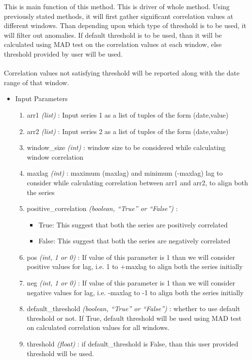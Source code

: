 This is main function of this method. This is driver of whole method. Using 
previously stated methods, it will first gather significant correlation values at different 
windows. Than depending upon which type of threshold is to be used, it will 
filter out anomalies. If default threshold is to be used, than it will be 
calculated using MAD test on the correlation values at each window, else 
threshold provided by user will be used. \\
\\
Correlation values not satisfying threshold will be reported along with the date 
range of that window.\\


\begin{itemize}
 \item Input Parameters
 
 \begin{enumerate}
  \item arr1 \textit{(list)} : Input series 1 as a list of tuples of the form 
(date,value)
  \item arr2 \textit{(list)} : Input series 2 as a list of tuples of the form 
(date,value)
  \item window\_size \textit{(int)} : window size to be considered while 
calculating window correlation
  \item maxlag \textit{(int)} : maximum (maxlag) and minimum (-maxlag) lag to 
consider while calculating correlation between arr1 and arr2, to align both the 
series
  \item positive\_correlation \textit{(boolean, ``True'' or ``False'')} : 
      \begin{itemize}
       \item True: This suggest that both the series are positively correlated
       \item False: This suggest that both the series are negatively correlated
      \end{itemize}
      
  \item pos \textit{(int, 1 or 0)} : If value of this parameter is 1 than we 
will consider positive values for lag, i.e. 1 to +maxlag to align both the 
series initially
  \item neg \textit{(int, 1 or 0)} : If value of this parameter is 1 than we 
will consider negative values for lag, i.e. -maxlag to -1 to align both the 
series initially
  \item default\_threshold \textit{(boolean, ``True'' or ``False'')} : whether 
to use default threshold or not. If True, default threshold will be used using 
MAD test on calculated correlation values for all windows.
  \item threshold \textit{(float)} : if default\_threshold is False, than this 
user provided threshold will be used.
 \end{enumerate}


\end{itemize}
